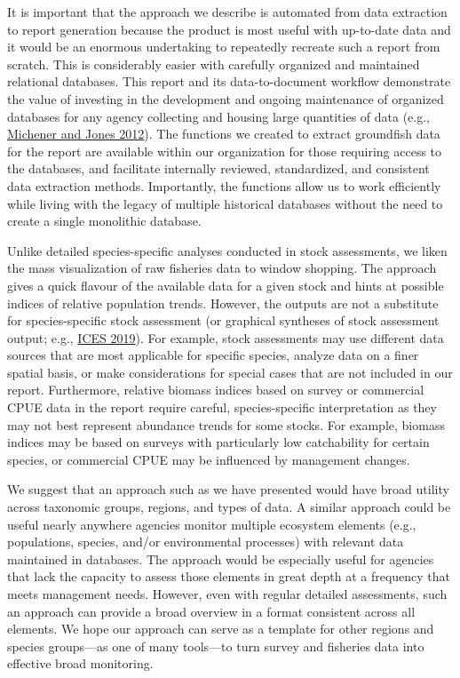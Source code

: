 \documentclass[12pt,]{article}
\begin{document}
It is important that the approach we describe is automated from data extraction to report generation because the product is most useful with up-to-date data and it would be an enormous undertaking to repeatedly recreate such a report from scratch.
This is considerably easier with carefully organized and maintained relational databases. This report and its data-to-document workflow demonstrate the value of investing in the development and ongoing maintenance of organized databases for any agency collecting and housing large quantities of data (e.g., \protect\hyperlink{ref-michener2012}{Michener and Jones 2012}). The functions we created to extract groundfish data for the report are available within our organization for those requiring access to the databases, and facilitate internally reviewed, standardized, and consistent data extraction methods.
Importantly, the functions allow us to work efficiently while living with the legacy of multiple historical databases without the need to create a single monolithic database.

Unlike detailed species-specific analyses conducted in stock assessments, we liken the mass visualization of raw fisheries data to window shopping.
The approach gives a quick flavour of the available data for a given stock and hints at possible indices of relative population trends.
However, the outputs are not a substitute for species-specific stock assessment (or graphical syntheses of stock assessment output; e.g., \protect\hyperlink{ref-ices2019}{ICES 2019}).
For example, stock assessments may use different data sources that are most applicable for specific species, analyze data on a finer spatial basis, or make considerations for special cases that are not included in our report.
Furthermore, relative biomass indices based on survey or commercial CPUE data in the report require careful, species-specific interpretation as they may not best represent abundance trends for some stocks.
For example, biomass indices may be based on surveys with particularly low catchability for certain species, or commercial CPUE may be influenced by management changes.

We suggest that an approach such as we have presented would have broad utility across taxonomic groups, regions, and types of data. A similar approach could be useful nearly anywhere agencies monitor multiple ecosystem elements (e.g., populations, species, and/or environmental processes) with relevant data maintained in databases. The approach would be especially useful for agencies that lack the capacity to assess those elements in great depth at a frequency that meets management needs. However, even with regular detailed assessments, such an approach can provide a broad overview in a format consistent across all elements.
We hope our approach can serve as a template for other regions and species groups---as one of many tools---to turn survey and fisheries data into effective broad monitoring.
\end{document}
